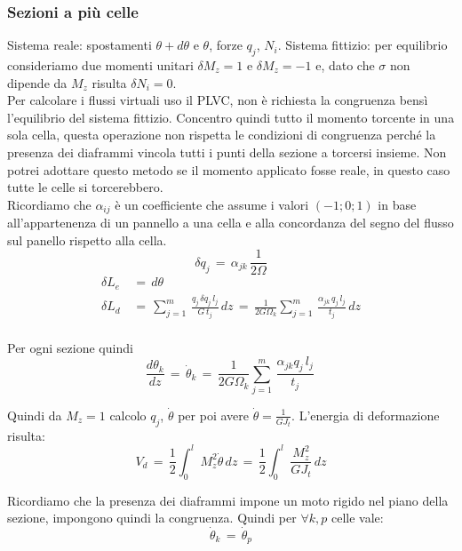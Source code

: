 \subsubsection*{ Sezioni a più celle}

Sistema reale: spostamenti $\theta + d\theta$ e $\theta$, forze $q_j$, $N_i$. Sistema fittizio: per equilibrio consideriamo due momenti unitari $\delta M_z =1$ e $\delta M_z =-1$ e, dato che $\sigma$ non dipende da $M_z$ risulta  $\delta N_i=0$. \\
Per calcolare i flussi virtuali uso il PLVC, non è richiesta la congruenza bensì l'equilibrio del sistema fittizio. Concentro quindi tutto il momento torcente in una sola cella, questa operazione non rispetta le condizioni di congruenza perché la presenza dei diaframmi vincola tutti i punti della sezione a torcersi insieme. Non potrei adottare questo metodo se il momento applicato fosse reale, in questo caso tutte le celle si torcerebbero.\\
Ricordiamo che $\alpha_{ij}$ è un coefficiente che assume i valori $(-1;0;1)$ in base all'appartenenza di un pannello a una cella e alla concordanza del segno del flusso sul panello rispetto alla cella.
\begin{equation*}
    \delta q_j\,=\,\alpha_{jk}\,\frac{1}{2\Omega}
\end{equation*}
\begin{align*}
     \delta L_e \,&=\, d\theta\\
     \delta L_d\,&=\, \sum^m_{j=1}\,\frac{q_j\,\delta q_j\,l_j}{G\,t_j}\,dz
    \,=\, \frac{1}{2G\Omega_k}\sum^m_{j=1}\,\frac{\alpha_{jk}\,q_j\,l_j}{t_j}\,dz\\
\end{align*}

Per ogni sezione quindi
\begin{equation*}
   \frac{d\theta_k}{dz} \,=\, \dot{\theta}_k \,=\,\frac{1}{2G\Omega_k}\sum^m_{j=1}\,\frac{\alpha_{jk}q_j\,l_j}{t_j}\,
\end{equation*}

Quindi da $M_z=1$ calcolo $q_j$, $\dot{\theta}$ per poi avere $\dot{\theta}=\frac{1}{GJ_t}$. L'energia di deformazione risulta:
\begin{equation*}
    V_d\,=\,\frac{1}{2}\int_0^l \, M_z^2\dot{\theta}\,dz \,=\,\frac{1}{2}\int_0^l \, \frac{M_z^2}{GJ_t}\,dz
\end{equation*}

Ricordiamo che la presenza dei diaframmi impone un moto rigido nel piano della sezione, impongono quindi la congruenza. Quindi per $\forall k,p$ celle vale:
\begin{equation*}
    \dot{\theta}_k\,=\,\dot{\theta}_p
\end{equation*}




